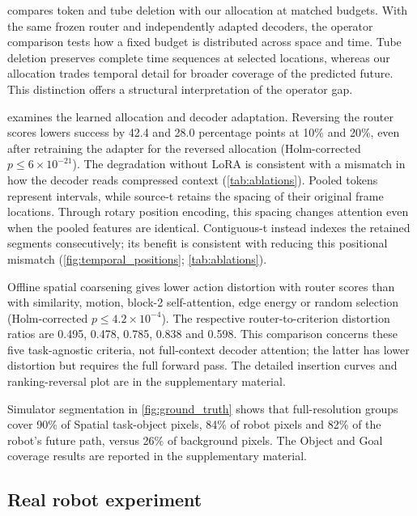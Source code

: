  compares token and tube deletion with our allocation at matched budgets.
With the same frozen router and independently adapted
decoders, the operator comparison tests how a fixed budget
is distributed across space and time.
Tube deletion preserves complete time sequences at selected
locations, whereas our allocation trades temporal detail
for broader coverage of the predicted future.
This distinction offers a structural interpretation of the
operator gap.

 examines the learned allocation and decoder adaptation.
Reversing the router scores lowers success by 42.4 and 28.0 percentage points at 10\% and 20\%, even after retraining the adapter for the reversed allocation (Holm-corrected $p\leq6\times10^{-21}$).
The degradation without LoRA is consistent with a mismatch
in how the decoder reads compressed context
(\cref{tab:ablations}).
Pooled tokens represent intervals, while source-t retains
the spacing of their original frame locations.
Through rotary position encoding, this spacing changes
attention even when the pooled features are identical.
Contiguous-t instead indexes the retained segments
consecutively; its benefit is consistent with reducing
this positional mismatch
(\cref{fig:temporal_positions}; \cref{tab:ablations}).



Offline spatial coarsening gives lower action distortion with router scores than with similarity, motion, block-2 self-attention, edge energy or random selection (Holm-corrected $p\leq4.2\times10^{-4}$).
The respective router-to-criterion distortion ratios are 0.495, 0.478, 0.785, 0.838 and 0.598.
This comparison concerns these five task-agnostic criteria, not full-context decoder attention; the latter has lower distortion but requires the full forward pass.
The detailed insertion curves and ranking-reversal plot are in the supplementary material.

Simulator segmentation in \cref{fig:ground_truth} shows that full-resolution groups cover 90\% of Spatial task-object pixels, 84\% of robot pixels and 82\% of the robot's future path, versus 26\% of background pixels.
The Object and Goal coverage results are reported in the supplementary material.



\subsection{Real robot experiment}
\label{sec:exp_real_robot}

